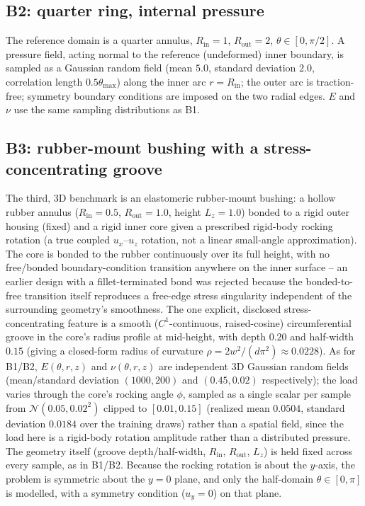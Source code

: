 \documentclass[final,5p,times]{elsarticle}
\begin{document}
\subsection{B2: quarter ring, internal pressure}
The reference domain is a quarter annulus, $R_{\text{in}}=1$, $R_{\text{out}}=2$,
$\theta\in[0,\pi/2]$. A pressure field, acting normal to the reference
(undeformed) inner boundary, is sampled as a Gaussian random field (mean
$5.0$, standard deviation $2.0$, correlation length $0.5\theta_{\max}$) along
the inner arc $r=R_{\text{in}}$; the outer arc is traction-free; symmetry
boundary conditions are imposed on the two radial edges. $E$ and $\nu$ use
the same sampling distributions as B1.

\subsection{B3: rubber-mount bushing with a stress-concentrating groove}
\label{sec:b3-geometry}
The third, 3D benchmark is an elastomeric rubber-mount bushing: a hollow
rubber annulus ($R_{\text{in}}=0.5$, $R_{\text{out}}=1.0$, height $L_z=1.0$)
bonded to a rigid outer housing (fixed) and a rigid inner core given a
prescribed rigid-body rocking rotation (a true coupled $u_x$--$u_z$ rotation,
not a linear small-angle approximation). The core is bonded to the rubber
continuously over its full height, with no free/bonded boundary-condition
transition anywhere on the inner surface -- an earlier design with a
fillet-terminated bond was rejected because the bonded-to-free transition
itself reproduces a free-edge stress singularity independent of the
surrounding geometry's smoothness. The one explicit, disclosed
stress-concentrating feature is a smooth ($C^1$-continuous, raised-cosine)
circumferential groove in the core's radius profile at mid-height, with
depth $0.20$ and half-width $0.15$ (giving a closed-form radius of curvature
$\rho = 2w^2/(d\pi^2) \approx 0.0228$). As for B1/B2, $E(\theta,r,z)$ and
$\nu(\theta,r,z)$ are independent 3D Gaussian random fields (mean/standard
deviation $(1000,200)$ and $(0.45,0.02)$ respectively); the load varies
through the core's rocking angle $\phi$, sampled as a single scalar per
sample from $\mathcal{N}(0.05,0.02^2)$ clipped to $[0.01,0.15]$ (realized
mean $0.0504$, standard deviation $0.0184$ over the training draws) rather than a spatial
field, since the load here is a rigid-body rotation amplitude rather than a
distributed pressure. The geometry itself (groove depth/half-width,
$R_{\text{in}}$, $R_{\text{out}}$, $L_z$) is held fixed across every sample,
as in B1/B2. Because the rocking rotation is about the $y$-axis, the
problem is symmetric about the $y{=}0$ plane, and only the half-domain
$\theta\in[0,\pi]$ is modelled, with a symmetry condition
($u_y{=}0$) on that plane.
\end{document}
